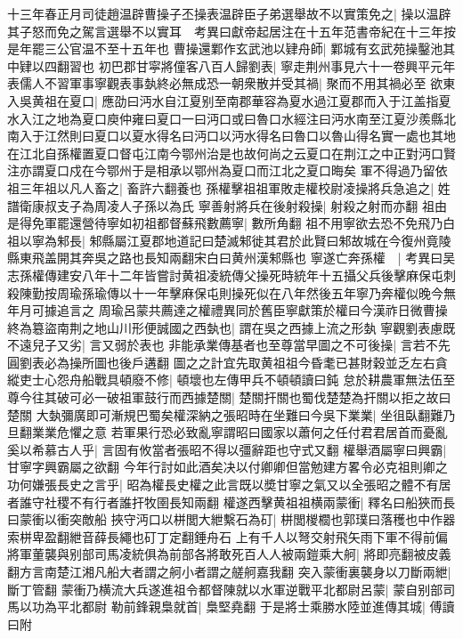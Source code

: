 十三年春正月司徒趙温辟曹操子丕操表温辟臣子弟選舉故不以實策免之|{
	操以温辟其子怒而免之駕言選舉不以實耳　考異曰獻帝起居注在十五年范書帝紀在十三年按是年罷三公官温不至十五年也}
曹操還鄴作玄武池以肄舟師|{
	鄴城有玄武苑操鑿池其中肄以四翻習也}
初巴郡甘寜將僮客八百人歸劉表|{
	寧走荆州事見六十一卷興平元年}
表儒人不習軍事寧觀表事埶終必無成恐一朝衆散并受其禍|{
	聚而不用其禍必至}
欲東入吳黄祖在夏口|{
	應劭曰沔水自江夏别至南郡華容為夏水過江夏郡而入于江盖指夏水入江之地為夏口庾仲雍曰夏口一曰沔口或曰魯口水經注曰沔水南至江夏沙羨縣北南入于江然則曰夏口以夏水得名曰沔口以沔水得名曰魯口以魯山得名實一處也其地在江北自孫權置夏口督屯江南今鄂州治是也故何尚之云夏口在荆江之中正對沔口賢注亦謂夏口戍在今鄂州于是相承以鄂州為夏口而江北之夏口晦矣}
軍不得過乃留依祖三年祖以凡人畜之|{
	畜許六翻養也}
孫權擊祖祖軍敗走權校尉凌操將兵急追之|{
	姓譜衛康叔支子為周凌人子孫以為氏}
寧善射將兵在後射殺操|{
	射殺之射而亦翻}
祖由是得免軍罷還營待寧如初祖都督蘇飛數薦寧|{
	數所角翻}
祖不用寧欲去恐不免飛乃白祖以寧為邾長|{
	邾縣屬江夏郡地道記曰楚滅邾徙其君於此賢曰邾故城在今復州竟陵縣東飛盖開其奔吳之路也長知兩翻宋白曰黄州漢邾縣也}
寧遂亡奔孫權　|{
	考異曰吴志孫權傳建安八年十二年皆嘗討黄祖凌統傳父操死時統年十五攝父兵後擊麻保屯刺殺陳勤按周瑜孫瑜傳以十一年擊麻保屯則操死似在八年然後五年寧乃奔權似晚今無年月可據追言之}
周瑜呂蒙共薦達之權禮異同於舊臣寧獻策於權曰今漢祚日微曹操終為簒盜南荆之地山川形便誠國之西埶也|{
	謂在吳之西據上流之形埶}
寧觀劉表慮既不遠兒子又劣|{
	言又弱於表也}
非能承業傳基者也至尊當早圖之不可後操|{
	言若不先圓劉表必為操所圖也後戶遘翻}
圖之之計宜先取黄祖祖今昏耄已甚財穀並乏左右貪縱吏士心怨舟船戰具頓廢不修|{
	頓壞也左傳甲兵不頓頓讀曰鈍}
怠於耕農軍無法伍至尊今往其破可必一破祖軍鼓行而西據楚關|{
	楚關扞關也蜀伐楚楚為扞關以拒之故曰楚關}
大埶彌廣即可漸規巴蜀矣權深納之張昭時在坐難曰今吳下業業|{
	坐徂臥翻難乃旦翻業業危懼之意}
若軍果行恐必致亂寧謂昭曰國家以蕭何之任付君君居首而憂亂奚以希慕古人乎|{
	言固有攸當者張昭不得以彊辭距也守式又翻}
權舉酒屬寧曰興霸|{
	甘寧字興霸屬之欲翻}
今年行討如此酒矣决以付卿卿但當勉建方畧令必克祖則卿之功何嫌張長史之言乎|{
	昭為權長史權之此言既以奬甘寧之氣又以全張昭之體不有居者誰守社稷不有行者誰扞牧圉長知兩翻}
權遂西擊黄祖祖横兩蒙衝|{
	釋名曰船狹而長曰蒙衝以衝突敵船}
挾守沔口以栟閭大紲繫石為矴|{
	栟閭椶櫚也郭璞曰落穫也中作器索栟卑盈翻紲音薛長繩也矴丁定翻錘舟石}
上有千人以弩交射飛矢雨下軍不得前偏將軍董襲與别部司馬凌統俱為前部各將敢死百人人被兩鎧乘大舸|{
	將即亮翻被皮義翻方言南楚江湘凡船大者謂之舸小者謂之艖舸嘉我翻}
突入蒙衝裏襲身以刀斷兩紲|{
	斷丁管翻}
蒙衝乃横流大兵遂進祖令都督陳就以水軍逆戰平北都尉呂蒙|{
	蒙自别部司馬以功為平北都尉}
勒前鋒親梟就首|{
	梟堅堯翻}
于是將士乘勝水陸並進傳其城|{
	傅讀曰附}
